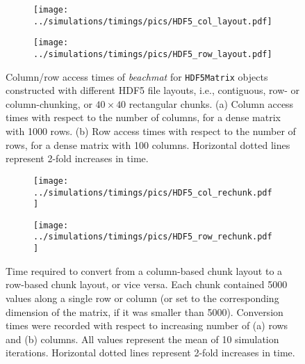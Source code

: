 \documentclass{article}
\newcommand{\beachmat}{\textit{beachmat}}
\newcommand{\code}[1]{\texttt{#1}}
\begin{document}
\begin{figure}[bt]
    \begin{subfigure}[b]{0.49\textwidth}
        \texttt{[image: ../simulations/timings/pics/HDF5\_col\_layout.pdf]}
        \caption{}
    \end{subfigure}
    \begin{subfigure}[b]{0.49\textwidth}
        \texttt{[image: ../simulations/timings/pics/HDF5\_row\_layout.pdf]}
        \caption{}
    \end{subfigure}
    \caption{Column/row access times of \beachmat{} for \code{HDF5Matrix} objects constructed with different HDF5 file layouts, 
        i.e., contiguous, row- or column-chunking, or $40\times40$ rectangular chunks.
        (a) Column access times with respect to the number of columns, for a dense matrix with 1000 rows.
        (b) Row access times with respect to the number of rows, for a dense matrix with 100 columns.
        Horizontal dotted lines represent 2-fold increases in time.
    }
    \label{fig:hdf5layout}
\end{figure}

\begin{figure}[bt]
    \begin{subfigure}[bt]{0.49\textwidth}
        \texttt{[image: ../simulations/timings/pics/HDF5\_col\_rechunk.pdf]}
        \caption{}
    \end{subfigure}
    \begin{subfigure}[bt]{0.49\textwidth}
        \texttt{[image: ../simulations/timings/pics/HDF5\_row\_rechunk.pdf]}
        \caption{}
    \end{subfigure}
    \caption{Time required to convert from a column-based chunk layout to a row-based chunk layout, or vice versa.
        Each chunk contained 5000 values along a single row or column (or set to the corresponding dimension of the matrix, if it was smaller than 5000).
        Conversion times were recorded with respect to increasing number of (a) rows and (b) columns.
        All values represent the mean of 10 simulation iterations.
        Horizontal dotted lines represent 2-fold increases in time.
    }
    \label{fig:hdf5rechunk}
\end{figure}
        
\end{document}

